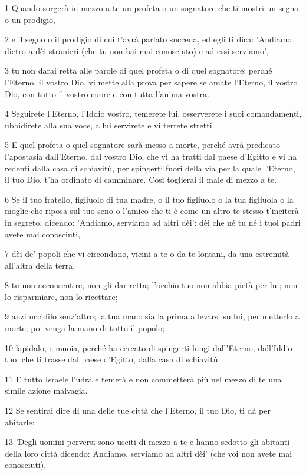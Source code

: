 \par 1 Quando sorgerà in mezzo a te un profeta o un sognatore che ti mostri un segno o un prodigio,
\par 2 e il segno o il prodigio di cui t'avrà parlato succeda, ed egli ti dica: 'Andiamo dietro a dèi stranieri (che tu non hai mai conosciuto) e ad essi serviamo',
\par 3 tu non darai retta alle parole di quel profeta o di quel sognatore; perché l'Eterno, il vostro Dio, vi mette alla prova per sapere se amate l'Eterno, il vostro Dio, con tutto il vostro cuore e con tutta l'anima vostra.
\par 4 Seguirete l'Eterno, l'Iddio vostro, temerete lui, osserverete i suoi comandamenti, ubbidirete alla sua voce, a lui servirete e vi terrete stretti.
\par 5 E quel profeta o quel sognatore sarà messo a morte, perché avrà predicato l'apostasia dall'Eterno, dal vostro Dio, che vi ha tratti dal paese d'Egitto e vi ha redenti dalla casa di schiavitù, per spingerti fuori della via per la quale l'Eterno, il tuo Dio, t'ha ordinato di camminare. Così toglierai il male di mezzo a te.
\par 6 Se il tuo fratello, figliuolo di tua madre, o il tuo figliuolo o la tua figliuola o la moglie che riposa sul tuo seno o l'amico che ti è come un altro te stesso t'inciterà in segreto, dicendo: 'Andiamo, serviamo ad altri dèi': dèi che né tu né i tuoi padri avete mai conosciuti,
\par 7 dèi de' popoli che vi circondano, vicini a te o da te lontani, da una estremità all'altra della terra,
\par 8 tu non acconsentire, non gli dar retta; l'occhio tuo non abbia pietà per lui; non lo risparmiare, non lo ricettare;
\par 9 anzi uccidilo senz'altro; la tua mano sia la prima a levarsi su lui, per metterlo a morte; poi venga la mano di tutto il popolo;
\par 10 lapidalo, e muoia, perché ha cercato di spingerti lungi dall'Eterno, dall'Iddio tuo, che ti trasse dal paese d'Egitto, dalla casa di schiavitù.
\par 11 E tutto Israele l'udrà e temerà e non commetterà più nel mezzo di te una simile azione malvagia.
\par 12 Se sentirai dire di una delle tue città che l'Eterno, il tuo Dio, ti dà per abitarle:
\par 13 'Degli uomini perversi sono usciti di mezzo a te e hanno sedotto gli abitanti della loro città dicendo: Andiamo, serviamo ad altri dèi' (che voi non avete mai conosciuti),
